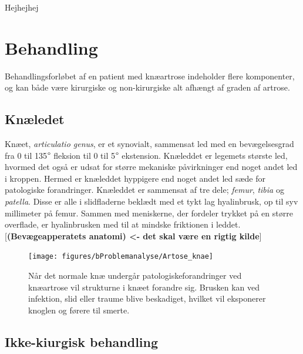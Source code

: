 Hejhejhej
\section{Behandling}
Behandlingsforløbet af en patient med knæartrose indeholder flere komponenter, og kan både være kirurgiske og non-kirurgiske alt afhængt af graden af artrose.
\subsection*{Knæledet}
Knæet, \textit{articulatio genus}, er et synovialt, sammensat led med en bevægelsesgrad fra 0 til 135$\degree$ fleksion til 0 til 5$\degree$ ekstension. Knæleddet er legemets største led, hvormed det også er udsat for større mekaniske påvirkninger end noget andet led i kroppen. Hermed er knæleddet hyppigere end noget andet led sæde for patologiske forandringer. Knæleddet er sammensat af tre dele; \textit{femur}, \textit{tibia} og \textit{patella}. Disse er alle i slidfladerne beklædt med et tykt lag hyalinbrusk, op til syv millimeter på femur. Sammen med meniskerne, der fordeler trykket på en større overflade, er hyalinbrusken med til at mindske friktionen i leddet. [\textbf{(Bevægeapperatets anatomi) <- det skal være en rigtig kilde}]




\begin{figure}[H] 
\begin{center}
\texttt{[image: figures/bProblemanalyse/Artose\_knae]}
\end{center}
\caption{Når det normale knæ undergår patologiskeforandringer ved knæartrose vil strukturne i knæet forandre sig. Brusken kan ved infektion, slid eller traume blive beskadiget, hvilket vil eksponerer knoglen og førere til smerte.\citep{schroder} \citep{adobe}} 
\label{fig:tka_implant} 
\end{figure}

\subsection{Ikke-kiurgisk behandling}

